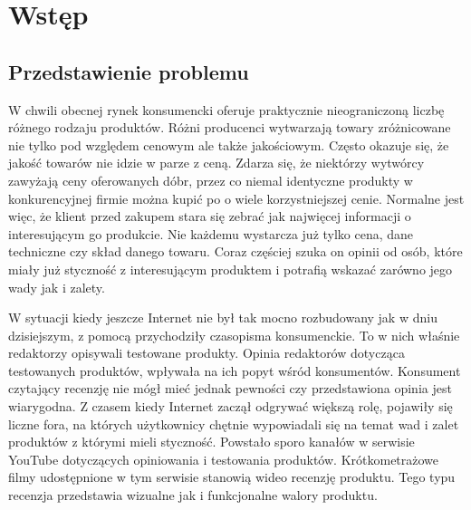 \chapter{Wstęp}

\section{Przedstawienie problemu}
W chwili obecnej rynek konsumencki oferuje praktycznie nieograniczoną liczbę różnego rodzaju produktów. Różni producenci wytwarzają towary zróżnicowane nie tylko pod względem cenowym ale także jakościowym. Często okazuje się, że jakość towarów nie idzie w parze z ceną. Zdarza się, że niektórzy wytwórcy  zawyżają ceny oferowanych dóbr, przez co niemal identyczne produkty w konkurencyjnej firmie można kupić po o wiele korzystniejszej cenie. Normalne jest więc, że klient przed zakupem stara się zebrać jak najwięcej informacji o interesującym go produkcie. Nie każdemu wystarcza już tylko cena, dane techniczne czy skład danego towaru.  Coraz częściej szuka on opinii od osób, które miały już styczność z interesującym produktem i potrafią wskazać zarówno jego wady jak i zalety. 

W sytuacji kiedy jeszcze Internet nie był tak mocno rozbudowany jak w dniu dzisiejszym, z pomocą przychodziły czasopisma konsumenckie. To w nich właśnie redaktorzy opisywali testowane produkty. Opinia redaktorów dotycząca testowanych produktów, wpływała na ich popyt wśród konsumentów. Konsument czytający recenzję nie mógł mieć jednak pewności czy przedstawiona opinia jest wiarygodna. Z czasem kiedy Internet zaczął odgrywać większą rolę, pojawiły się liczne fora, na których użytkownicy chętnie wypowiadali się na temat wad i zalet produktów z którymi mieli styczność. Powstało sporo kanałów w serwisie YouTube dotyczących opiniowania i testowania produktów. Krótkometrażowe filmy udostępnione w tym serwisie stanowią wideo recenzję produktu.  Tego typu recenzja przedstawia wizualne jak i funkcjonalne walory produktu. 

